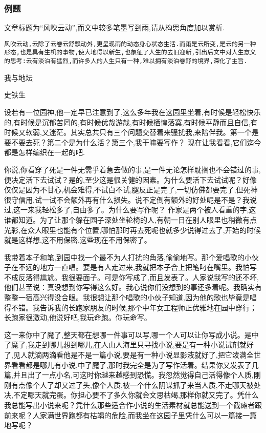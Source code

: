 \documentclass{ctexart}
\newcommand{\nm}{\normalsize}
\renewcommand{\\}{\par}
\begin{document}
\subsubsection{例题}
文章标题为``风吹云动'',而文中较多笔墨写到雨,请从构思角度加以赏析.\\
\texttt{风吹云动,云除了云卷云舒飘动外,更呈现雨的动态身心状态生活.而雨是云所变,是云的另一种形态,也是具有生机的事物,使大地得以新生,也象征了人生的去旧迎新,引出后文中对人生意义的思考:云有淡泊有猛烈,而许多人的人生只有一种,难以拥有淡泊卷舒的境界,深化了主旨.}
\nm \fangsong 
\\\centerline{我与地坛}\\\centerline{史铁生}
\\设若有一位园神,他一定早已注意到了,这么多年我在这园里坐着,有时候是轻松快乐的,有时候是沉郁苦罔的,有时候优哉游哉,有时候栖惶落寞,有时候平静而且自信,有时候又软弱,又迷茫。其实总共只有三个问题交替着来骚扰我,来陪伴我。第一个是要不要去死？第二个是为什么活？第三个,我干嘛要写作？ 现在让我看看,它们迄今都是怎样编织在一起的吧.
\\你说,你看穿了死是一件无需乎着急去做的事,是一件无论怎样耽搁也不会错过的事,便决定活下去试试？是的,至少这是很关健的因素。为什么要活下去试试呢？好像仅仅是因为不甘心,机会难得,不试白不试,腿反正是完了,一切仿佛都要完了,但死神很守信用,试一试不会额外再有什么损失。说不定倒有额外的好处呢是不是？我说过,这一来我轻松多了,自由多了。为什么要写作呢？ 作家是两个被人看重的字,这谁都知道。为了让那个躲在园子深处坐轮椅的人,有朝一日在别人眼里也稍微有点光彩,在众人眼里也能有个位置,哪怕那时再去死呢也就多少说得过去了,开始的时候就是这样想,这不用保密,这些现在不用保密了。 
\\我带着本子和笔,到园中找一个最不为人打扰的角落,偷偷地写。那个爱唱歌的小伙子在不远的地方一直唱。要是有人走过来,我就把本子合上把笔叼在嘴里。我怕写不成反落得尴尬。我很要面子。可是你写成了,而且发表了。人家说我写的还不坏,他们甚至说：真没想到你写得这么好。我心说你们没想到的事还多着呢。我确实有整整一宿高兴得没合眼。我很想让那个唱歌的小伙子知道,因为他的歌也毕竟是唱得不错。我告诉我的长跑家朋友的时候,那个中年女工程师正优雅地在园中穿行；长跑家很激动,他说好吧,我玩命跑。你玩命写。
\\这一来你中了魔了,整天都在想哪一件事可以写,哪一个人可以让你写成小说。是中了魔了,我走到哪儿想到哪儿,在人山人海里只寻找小说,要是有一种小说试剂就好了,见人就滴两滴看他是不是一篇小说,要是有一种小说显影液就好了,把它泼满全世界看看都是哪儿有小说,中了魔了,那时我完全是为了写作活着。结果你又发表了几篇,并且出了一点小名,可这时你越来越感到恐慌。我忽然觉得自己活得像个人质,刚刚有点像个人了却又过了头,像个人质,被一个什么阴谋抓了来当人质,不走哪天被处决,不定哪天就完蛋。你担心要不了多久你就会文思枯竭,那样你就又完了。凭什么我总能写出小说来呢？凭什么那些适合作小说的生活素材就总能送到一个截瘫者跟前来呢？人家满世界跑都有枯竭的危险,而我坐在这园子里凭什么可以一篇接一篇地写呢？
\end{document}

